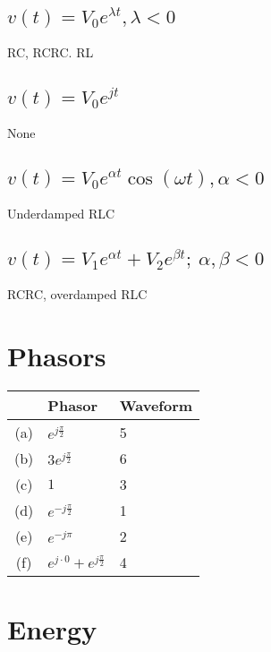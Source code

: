 \documentclass[]{article}
\begin{document}
\subsection{\(v(t) = V_0 e^{\lambda t}, \lambda < 0\)}

RC, RCRC. RL

\subsection{\(v(t) = V_0 e^{jt}\)}

None

\subsection{\(v(t) = V_0 e^{\alpha t} \cos(\omega t), \alpha < 0\)}

Underdamped RLC

\subsection{\(v(t) = V_1 e^{\alpha t} + V_2 e^{\beta t}; \ \alpha, \beta < 0\)}

RCRC, overdamped RLC

\section{Phasors}

\begin{center}
\begin{tabular}{c||l|l}
	& \textbf{Phasor} & \textbf{Waveform} \\
	\hline
	(a) & \(e^{j \frac{\pi}{2}}\) & 5 \\
	(b) & \(3e^{j \frac{\pi}{2}}\) & 6 \\
	(c) & \(1\) & 3 \\
	(d) & \(e^{-j \frac{\pi}{2}}\) & 1 \\
	(e) & \(e^{-j \pi}\) & 2 \\
	(f) & \(e^{j \cdot 0} + e^{j \frac{\pi}{2}}\) & 4
\end{tabular}
\end{center}

\section{Energy}

\subsection{}
\end{document}
